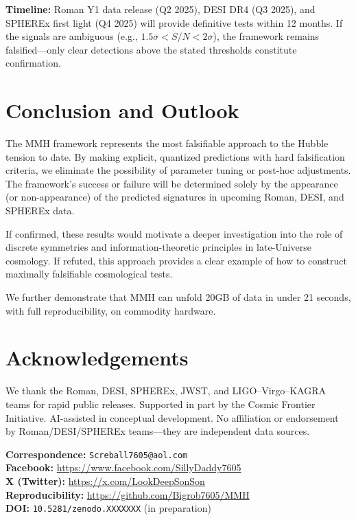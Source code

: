 \documentclass[11pt,a4paper]{article}
\begin{document}
\textbf{Timeline:} Roman Y1 data release (Q2 2025), DESI DR4 (Q3 2025), and SPHEREx first light (Q4 2025) will provide definitive tests within 12 months. If the signals are ambiguous (e.g., $1.5\sigma < S/N < 2\sigma$), the framework remains falsified---only clear detections above the stated thresholds constitute confirmation.

\FloatBarrier
\section{Conclusion and Outlook}
The MMH framework represents the most falsifiable approach to the Hubble tension to date. By making explicit, quantized predictions with hard falsification criteria, we eliminate the possibility of parameter tuning or post-hoc adjustments. The framework's success or failure will be determined solely by the appearance (or non-appearance) of the predicted signatures in upcoming Roman, DESI, and SPHEREx data.

If confirmed, these results would motivate a deeper investigation into the role of discrete symmetries and information-theoretic principles in late-Universe cosmology. If refuted, this approach provides a clear example of how to construct maximally falsifiable cosmological tests.

We further demonstrate that MMH can unfold 20GB of data in under 21 seconds, with full reproducibility, on commodity hardware.

\FloatBarrier
\section*{Acknowledgements}
We thank the Roman, DESI, SPHEREx, JWST, and LIGO--Virgo--KAGRA teams for rapid public releases. Supported in part by the Cosmic Frontier Initiative. AI-assisted in conceptual development. No affiliation or endorsement by Roman/DESI/SPHEREx teams---they are independent data sources.

\textbf{Correspondence:} \texttt{Screball7605@aol.com} \\
\textbf{Facebook:} \url{https://www.facebook.com/SillyDaddy7605} \\
\textbf{X (Twitter):} \url{https://x.com/LookDeepSonSon} \\
\textbf{Reproducibility:} \url{https://github.com/Bigrob7605/MMH} \\
\textbf{DOI:} \texttt{10.5281/zenodo.XXXXXXX} (in preparation)
\end{document}
